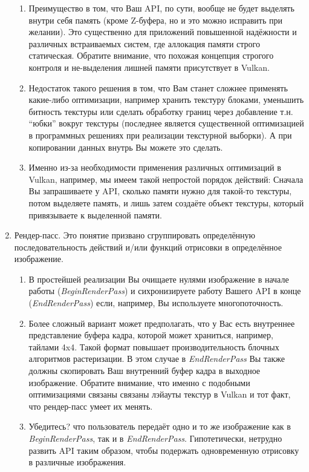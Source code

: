 \documentclass[12pt,subf,href,colorlinks=true]{article}
\begin{document}
\begin{enumerate}
  \begin{enumerate}
    \item Преимущество в том, что Ваш API, по сути, вообще не будет выделять внутри себя память (кроме Z-буфера, но и это можно исправить при желании). Это существенно для приложений повышенной надёжности и различных встраиваемых систем, где аллокация памяти строго статическая. Обратите внимание, что похожая концепция строгого контроля и не-выделения лишней памяти присутствует в Vulkan.

    \item Недостаток такого решения в том, что Вам станет сложнее применять какие-либо оптимизации, например хранить текстуру блоками, уменьшить битность текстуры или сделать обработку границ через добавление т.н. ``юбки'' вокруг текстуры (последнее является существенной оптимизацией в программных решениях при реализации текстурной выборки). А при копировании данных внутрь Вы можете это сделать.

    \item Именно из-за необходимости применения различных оптимизаций в Vulkan, например, мы имеем такой непростой порядок действий: Сначала Вы запрашиваете у API, сколько памяти нужно для такой-то текстуры, потом выделяете память, и лишь затем создаёте объект текстуры, который привязываете к выделенной памяти.
  \end{enumerate}

  \item Рендер-пасс. Это понятие призвано сгруппировать определённую последовательность действий и/или функций отрисовки в определённое изображение.

  \begin{enumerate}
    \item В простейшей реализации Вы очищаете нулями изображение в начале работы (\textit{BeginRenderPass}) и сихронизируете работу Вашего API в конце (\textit{EndRenderPass}) если, например, Вы используете многопоточность.

    \item Более сложный вариант может предполагать, что у Вас есть внутреннее представление буфера кадра, которой может храниться, например, тайлами 4x4. Такой формат повышает производительность блочных алгоритмов растеризации. В этом случае в \textit{EndRenderPass} Вы также должны скопировать Ваш внутренний буфер кадра в выходное изображение. Обратите внимание, что именно с подобными оптимизациями связаны связаны лэйауты текстур в Vulkan и тот факт, что рендер-пасс умеет их менять.

    \item Убедитесь? что пользователь передаёт одно и то же изображение как в \textit{BeginRenderPass}, так и в \textit{EndRenderPass}. Гипотетически, нетрудно развить API таким образом, чтобы подержать одновременную отрисовку в различные изображения.
  \end{enumerate}
\end{enumerate}
\end{document}
